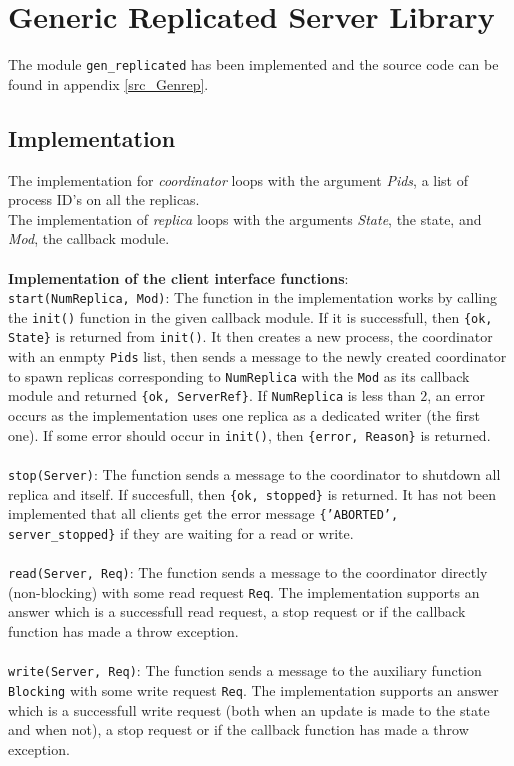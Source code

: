 \documentclass[a4paper]{article}
\begin{document}
\section{Generic Replicated Server Library}
The module \texttt{gen\_replicated} has been implemented and the source code can be found in appendix \ref{src_Genrep}.
\subsection{Implementation}
The implementation for \textit{coordinator} loops with the argument \textit{Pids}, a list of process ID's on all the replicas.\\
The implementation of \textit{replica} loops with the arguments \textit{State}, the state, and \textit{Mod}, the callback module. \\
\\
\textbf{Implementation of the client interface functions}: \\
\texttt{start(NumReplica, Mod)}: The function in the implementation works by calling the \texttt{init()} function in the given callback module. If it is successfull, then \texttt{\{ok, State\}} is returned from \texttt{init()}. It then creates a new process, the coordinator with an enmpty \texttt{Pids} list, then sends a message to the newly created coordinator to spawn replicas corresponding to \texttt{NumReplica} with the \texttt{Mod} as its callback module and returned \texttt{\{ok, ServerRef\}}.
If \texttt{NumReplica} is less than $2$, an error occurs as the implementation uses one replica as a dedicated writer (the first one). If some error should occur in \texttt{init()}, then \texttt{\{error, Reason\}} is returned. \\
\\
\texttt{stop(Server)}: The function sends a message to the coordinator to shutdown all replica and itself. If succesfull, then \texttt{\{ok, stopped\}} is returned. It has not been implemented that all clients get the error message \texttt{\{'ABORTED', server\_stopped\}} if they are waiting for a read or write. \\
\\
\texttt{read(Server, Req)}: The function sends a message to the coordinator directly (non-blocking) with some read request \texttt{Req}. The implementation supports an answer which is a successfull read request, a stop request or if the callback function has made a throw exception. \\
\\
\texttt{write(Server, Req)}: The function sends a message to the auxiliary function \texttt{Blocking} with some write request \texttt{Req}. The implementation supports an answer which is a successfull write request (both when an update is made to the state and when not), a stop request or if the callback function has made a throw exception. \\
\end{document}

